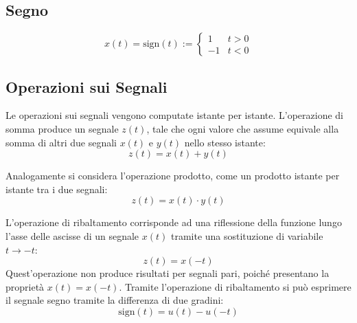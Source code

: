 \documentclass{article}
\numberwithin{equation}{subsection}
\begin{document}
\subsection{Segno}

\begin{equation*}
    x(t)=\mbox{sign}(t):=\begin{cases}
        1&t>0\\
        -1&t<0
    \end{cases}
\end{equation*}

\begin{center}
\end{center}

\subsection{Operazioni sui Segnali}

Le operazioni sui segnali vengono computate istante per istante. L'operazione di somma produce un segnale $z(t)$, tale che ogni valore che assume equivale alla somma 
di altri due segnali $x(t)$ e $y(t)$ nello stesso istante:
\begin{equation*}
    z(t)=x(t)+y(t)
\end{equation*}

Analogamente si considera l'operazione prodotto, come un prodotto istante per istante tra i due segnali:
\begin{equation*}
    z(t)=x(t)\cdot y(t)
\end{equation*}

L'operazione di ribaltamento corrisponde ad una riflessione della funzione lungo l'asse delle ascisse di un segnale $x(t)$ tramite una sostituzione di variabile $t\to-t$:
\begin{equation*}
    z(t)=x(-t)
\end{equation*}
Quest'operazione non produce risultati per segnali pari, poiché presentano la proprietà $x(t)=x(-t)$. 
Tramite l'operazione di ribaltamento si può esprimere il segnale segno tramite la differenza di due gradini:
\begin{equation*}
    \mbox{sign}(t)=u(t)-u(-t)
\end{equation*}
\end{document}
